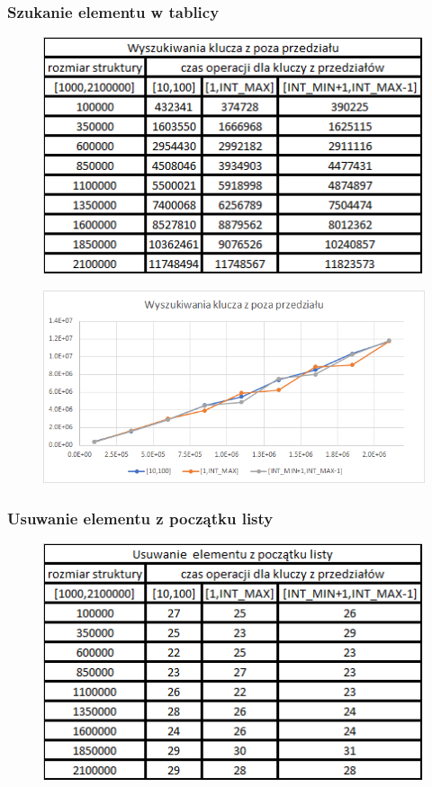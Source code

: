 \documentclass{article}
\begin{document}
\newpage

\subsubsection*{Szukanie elementu w tablicy}

\begin{figure}[h!]

\includegraphics{images/list_Szukanie.png}

\end{figure}

\begin{figure}[h!]
\includegraphics[width=11.3cm]{images/list_wyszukaj_w.png}
\end{figure}

\newpage

\subsubsection*{Usuwanie elementu z początku listy}

\begin{figure}[h!]

\includegraphics{images/list_usuwanie_pocz.png}

\end{figure}
\end{document}
